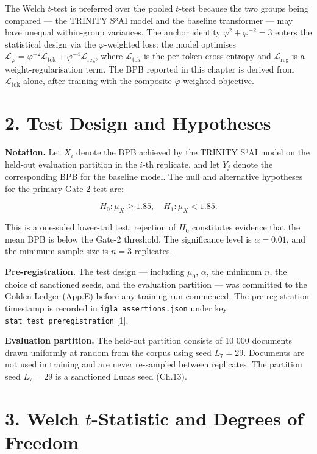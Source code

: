 The Welch \(t\)-test is preferred over the pooled
\(t\)-test because the two groups being compared
--- the TRINITY S³AI model and the baseline
transformer --- may have unequal within-group
variances. The anchor identity
\(\varphi^2 + \varphi^{-2} = 3\) enters the
statistical design via the \(\varphi\)-weighted
loss: the model optimises
\(\mathcal{L}_\varphi = \varphi^{-2} \mathcal{L}_{\text{tok}} + \varphi^{-4} \mathcal{L}_{\text{reg}}\),
where \(\mathcal{L}_\text{tok}\) is the per-token
cross-entropy and \(\mathcal{L}_\text{reg}\) is a
weight-regularisation term. The BPB reported in
this chapter is derived from
\(\mathcal{L}_\text{tok}\) alone, after training
with the composite \(\varphi\)-weighted objective.

\section{2. Test Design and
Hypotheses}\label{fa_19:test-design-and-hypotheses}

\textbf{Notation.} Let \(X_i\) denote the BPB
achieved by the TRINITY S³AI model on the held-out
evaluation partition in the \(i\)-th replicate,
and let \(Y_j\) denote the corresponding BPB for
the baseline model. The null and alternative
hypotheses for the primary Gate-2 test are:

\[H_0: \mu_X \geq 1.85, \quad H_1: \mu_X < 1.85.\]

This is a one-sided lower-tail test: rejection of
\(H_0\) constitutes evidence that the mean BPB is
below the Gate-2 threshold. The significance level
is \(\alpha = 0.01\), and the minimum sample size
is \(n = 3\) replicates.

\textbf{Pre-registration.} The test design ---
including \(\mu_0\), \(\alpha\), the minimum
\(n\), the choice of sanctioned seeds, and the
evaluation partition --- was committed to the
Golden Ledger (App.E) before any training run
commenced. The pre-registration timestamp is
recorded in \texttt{igla\_assertions.json} under
key \texttt{stat\_test\_preregistration} [1].

\textbf{Evaluation partition.} The held-out
partition consists of 10 000 documents drawn
uniformly at random from the corpus using seed
\(L_7 = 29\). Documents are not used in training
and are never re-sampled between replicates. The
partition seed \(L_7 = 29\) is a sanctioned Lucas
seed (Ch.13).

\section{\texorpdfstring{3. Welch
\(t\)-Statistic and Degrees of
Freedom}{3. Welch t-Statistic and Degrees of Freedom}}\label{fa_19:welch-t-statistic-and-degrees-of-freedom}

